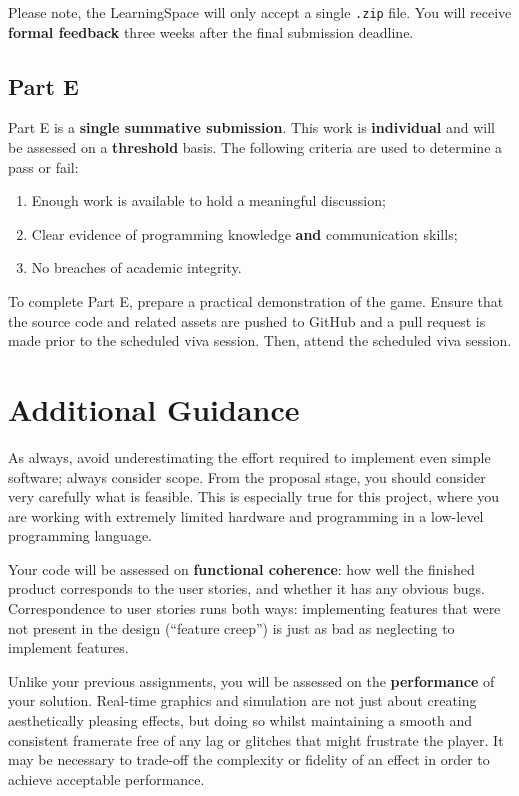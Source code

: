 \documentclass{../../fal_assignment}
\begin{document}
Please note, the LearningSpace will only accept a single \texttt{.zip} file. You will receive \textbf{formal feedback} three weeks after the final submission deadline.

\subsection*{Part E}

Part E is a \textbf{single summative submission}. This work is \textbf{individual} and will be assessed on a \textbf{threshold} basis.  The following criteria are used to determine a pass or fail:

\begin{enumerate}[label=(\alph*)]
	\item Enough work is available to hold a meaningful discussion;
	\item Clear evidence of programming knowledge \textbf{and} communication skills;
	\item No breaches of academic integrity.
\end{enumerate}

To complete Part E, prepare a practical demonstration of the game. Ensure that the source code and related assets are pushed to GitHub and a pull request is made prior to the scheduled viva session. Then, attend the scheduled viva session.

\section*{Additional Guidance}

As always, avoid underestimating the effort required to implement even simple software; always consider scope.
From the proposal stage, you should consider very carefully what is feasible.
This is especially true for this project, where you are working with extremely limited hardware
and programming in a low-level programming language.

Your code will be assessed on \textbf{functional coherence}:
how well the finished product corresponds to the user stories,
and whether it has any obvious bugs.
Correspondence to user stories runs both ways:
implementing features that were not present in the design (``feature creep'')
is just as bad as neglecting to implement features.

Unlike your previous assignments,
you will be assessed on the \textbf{performance} of your solution.
Real-time graphics and simulation are not just about creating aesthetically pleasing effects,
but doing so whilst maintaining a smooth and consistent framerate free of any lag or glitches that might frustrate the player.
It may be necessary to trade-off the complexity or fidelity of an effect
in order to achieve acceptable performance.
\end{document}
